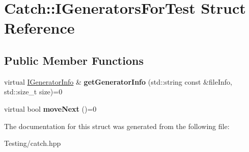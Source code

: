 \hypertarget{struct_catch_1_1_i_generators_for_test}{\section{Catch\-:\-:I\-Generators\-For\-Test Struct Reference}
\label{struct_catch_1_1_i_generators_for_test}
}
\subsection*{Public Member Functions}
\begin{DoxyCompactItemize}
\item 
\hypertarget{struct_catch_1_1_i_generators_for_test_a180d84e858840188e4c3788e47eefdb0}{virtual \hyperlink{struct_catch_1_1_i_generator_info}{I\-Generator\-Info} \& {\bfseries get\-Generator\-Info} (std\-::string const \&file\-Info, std\-::size\-\_\-t size)=0}\label{struct_catch_1_1_i_generators_for_test_a180d84e858840188e4c3788e47eefdb0}

\item 
\hypertarget{struct_catch_1_1_i_generators_for_test_adab31832d529fc584fd63164e0a1c8ad}{virtual bool {\bfseries move\-Next} ()=0}\label{struct_catch_1_1_i_generators_for_test_adab31832d529fc584fd63164e0a1c8ad}

\end{DoxyCompactItemize}


The documentation for this struct was generated from the following file\-:\begin{DoxyCompactItemize}
\item 
Testing/catch.\-hpp\end{DoxyCompactItemize}
